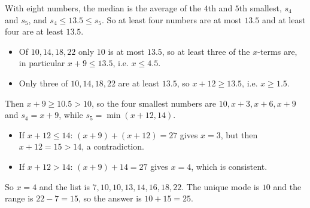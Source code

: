 With eight numbers, the median is the average of the $4$th and $5$th smallest, $s_4$ and $s_5$, and $s_4\le13.5\le s_5$. So at least four numbers are at most $13.5$ and at least four are at least $13.5$.
\begin{itemize}
\item Of $10,14,18,22$ only $10$ is at most $13.5$, so at least three of the $x$-terms are, in particular $x+9\le13.5$, i.e. $x\le4.5$.
\item Only three of $10,14,18,22$ are at least $13.5$, so $x+12\ge13.5$, i.e. $x\ge1.5$.
\end{itemize}
Then $x+9\ge10.5>10$, so the four smallest numbers are $10,x+3,x+6,x+9$ and $s_4=x+9$, while $s_5=\min(x+12,14)$.
\begin{itemize}
\item If $x+12\le14$: $(x+9)+(x+12)=27$ gives $x=3$, but then $x+12=15>14$, a contradiction.
\item If $x+12>14$: $(x+9)+14=27$ gives $x=4$, which is consistent.
\end{itemize}
So $x=4$ and the list is $7,10,10,13,14,16,18,22$. The unique mode is $10$ and the range is $22-7=15$, so the answer is $10+15=\boxed{25}$.
